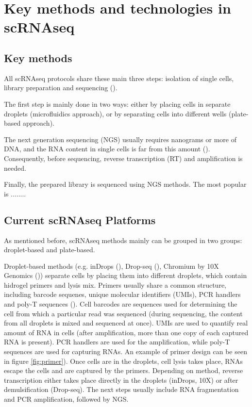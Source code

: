 \section{Key methods and technologies in scRNAseq}

\subsection{Key methods}

All scRNAseq protocols share these main three steps:
isolation of single cells, library preparation and sequencing (\cite{Andrews2018}).

The first step is mainly done in two ways:
either by placing cells in separate droplets (microfluidics approach),
or by separating cells into different wells (plate-based approach).

The next generation sequencing (NGS) usually requires nanograms or more of DNA,
and the RNA content in single cells is far from this amount (\cite{Wu2017}).
Consequently, before sequencing, reverse transcription (RT) and amplification is needed.

Finally, the prepared library is sequenced using NGS methods.
The most popular is ........

\subsection{Current scRNAseq Platforms}

As mentioned before, scRNAseq methods mainly can be grouped in two groups: droplet-based and plate-based.

Droplet-based methods (e.g. inDrops (\cite{Klein2015}), Drop-seq (\cite{Macosko2015}),
Chromium by 10X Genomics (\cite{Zheng2017}))
separate cells by placing them into different droplets, which contain hidrogel primers and lysis mix.
Primers usually share a common structure, including barcode sequenes, unique molecular identifiers (UMIs),
PCR handlers and poly-T sequences (\cite{Zhang2019}).
Cell barcodes are sequences used for determining the cell from which a particular read was sequenced
(during sequencing, the content from all droplets is mixed and sequenced at once).
UMIs are used to quantify real amount of RNA in cells
(after amplification, more than one copy of each captured RNA is present).
PCR handlers are used for the amplification, while poly-T sequences are used for capturing RNAs.
An example of primer design can be seen in figure \ref{fig:primer}).
Once cells are in the droplets, cell lysis takes place, RNAs escape the cells and are captured by the primers.
Depending on method,
reverse transcription either takes place directly in the droplets (inDrops, 10X) or after demulsification (Drop-seq).
The next steps usually include RNA fragmentation and PCR amplification, followed by NGS.

